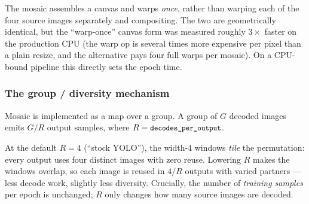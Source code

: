 
\begin{why}
The mosaic assembles a canvas and warps \emph{once}, rather than warping each of the four
source images separately and compositing. The two are geometrically identical, but the
``warp-once'' canvas form was measured roughly $3\times$ faster on the production CPU
(the warp op is several times more expensive per pixel than a plain resize, and the
alternative pays four full warps per mosaic). On a CPU-bound pipeline this directly sets
the epoch time.
\end{why}

\subsubsection{The group / diversity mechanism}
Mosaic is implemented as a map over a  group. A group of
$G$ decoded images emits $G/R$ output samples, where $R=\texttt{\small decodes\_per\_output}$.

\begin{center}
\end{center}

\noindent At the default $R=4$ (``stock YOLO''), the width-4 windows \emph{tile} the
permutation: every output uses four distinct images with zero reuse. Lowering $R$ makes
the windows overlap, so each image is reused in $4/R$ outputs with varied partners --- less
decode work, slightly less diversity. Crucially, the number of \emph{training samples} per
epoch is unchanged; $R$ only changes how many source images are decoded.


